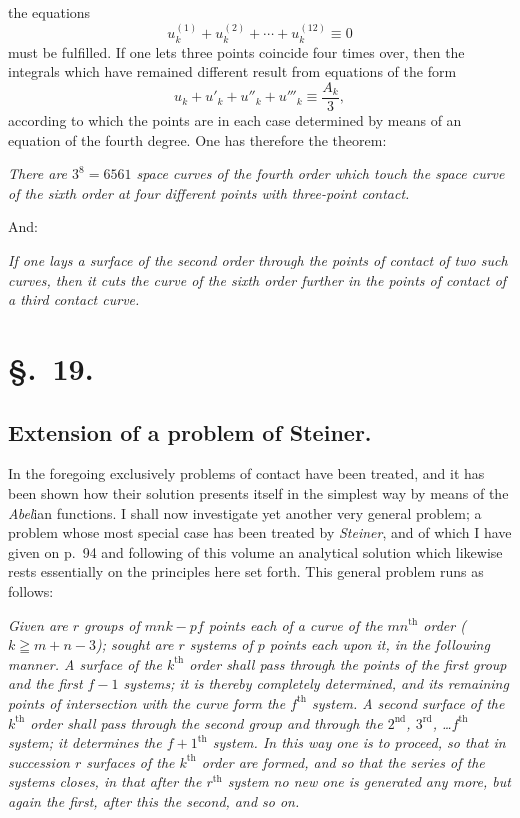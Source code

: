 \documentclass{article}
\begin{document}
the equations
\[ u_{k}^{(1)}+u_{k}^{(2)}+\cdots+u_{k}^{(12)} \equiv 0 \]
must be fulfilled. If one lets three points coincide four times over, then the integrals which have remained different result from equations of the form
\[ u_{k}+u'_{k}+u''_{k}+u'''_{k} \equiv \frac{A_{k}}{3}, \]
according to which the points are in each case determined by means of an equation of the fourth degree. One has therefore the theorem:

\emph{There are $3^{8} = 6561$ space curves of the fourth order which touch the space curve of the sixth order at four different points with three-point contact.}

And:

\emph{If one lays a surface of the second order through the points of contact of two such curves, then it cuts the curve of the sixth order further in the points of contact of a third contact curve.}

\section*{§.~19.}
\subsection*{Extension of a problem of Steiner.}

In the foregoing exclusively problems of contact have been treated, and it has been shown how their solution presents itself in the simplest way by means of the \emph{Abel}ian functions. I shall now investigate yet another very general problem; a problem whose most special case has been treated by \emph{Steiner}, and of which I have given on p.\ 94 and following of this volume an analytical solution which likewise rests essentially on the principles here set forth. This general problem runs as follows:

\emph{Given are $r$ groups of $mnk-pf$ points each of a curve of the $mn^{\text{th}}$ order ($k \geqq m+n-3$); sought are $r$ systems of $p$ points each upon it, in the following manner. A surface of the $k^{\text{th}}$ order shall pass through the points of the first group and the first $f-1$ systems; it is thereby completely determined, and its remaining points of intersection with the curve form the $f^{\text{th}}$ system. A second surface of the $k^{\text{th}}$ order shall pass through the second group and through the $2^{\text{nd}}$, $3^{\text{rd}}$, \ldots $f^{\text{th}}$ system; it determines the $f+1^{\text{th}}$ system. In this way one is to proceed, so that in succession $r$ surfaces of the $k^{\text{th}}$ order are formed, and so that the series of the systems closes, in that after the $r^{\text{th}}$ system no new one is generated any more, but again the first, after this the second, and so on.}
\end{document}
